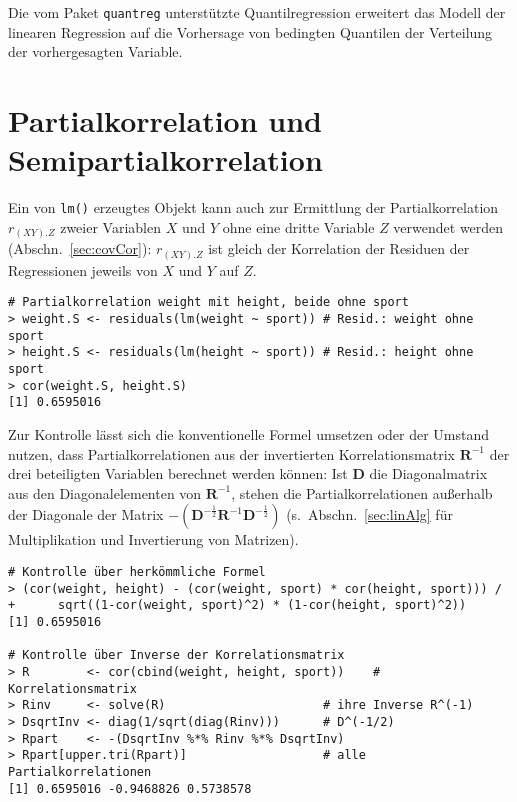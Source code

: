 Die vom Paket \lstinline!quantreg! \cite{Koenker2024} unterstützte Quantilregression erweitert das Modell der linearen Regression auf die Vorhersage von bedingten Quantilen der Verteilung der vorhergesagten Variable.

\section{Partialkorrelation und Semipartialkorrelation}
\label{sec:partCorReg}

Ein von \lstinline!lm()! erzeugtes Objekt kann auch zur Ermittlung der Partialkorrelation $r_{(XY).Z}$ zweier Variablen $X$ und $Y$ ohne eine dritte Variable $Z$ verwendet werden (Abschn.\ \ref{sec:covCor}): $r_{(XY).Z}$ ist gleich der Korrelation der Residuen der Regressionen jeweils von $X$ und $Y$ auf $Z$.
\begin{lstlisting}
# Partialkorrelation weight mit height, beide ohne sport
> weight.S <- residuals(lm(weight ~ sport)) # Resid.: weight ohne sport
> height.S <- residuals(lm(height ~ sport)) # Resid.: height ohne sport
> cor(weight.S, height.S)
[1] 0.6595016
\end{lstlisting}

Zur Kontrolle lässt sich die konventionelle Formel umsetzen oder der Umstand nutzen, dass Partialkorrelationen aus der invertierten Korrelationsmatrix $\bm{R}^{-1}$ der drei beteiligten Variablen berechnet werden können: Ist $\bm{D}$ die Diagonalmatrix aus den Diagonalelementen von $\bm{R}^{-1}$, stehen die Partialkorrelationen außerhalb der Diagonale der Matrix $-(\bm{D}^{-\frac{1}{2}} \bm{R}^{-1} \bm{D}^{-\frac{1}{2}})$ (s.\ Abschn.\ \ref{sec:linAlg} für Multiplikation und Invertierung von Matrizen).
\begin{lstlisting}
# Kontrolle über herkömmliche Formel
> (cor(weight, height) - (cor(weight, sport) * cor(height, sport))) /
+      sqrt((1-cor(weight, sport)^2) * (1-cor(height, sport)^2))
[1] 0.6595016

# Kontrolle über Inverse der Korrelationsmatrix
> R        <- cor(cbind(weight, height, sport))    # Korrelationsmatrix
> Rinv     <- solve(R)                      # ihre Inverse R^(-1)
> DsqrtInv <- diag(1/sqrt(diag(Rinv)))      # D^(-1/2)
> Rpart    <- -(DsqrtInv %*% Rinv %*% DsqrtInv)
> Rpart[upper.tri(Rpart)]                   # alle Partialkorrelationen
[1] 0.6595016 -0.9468826 0.5738578
\end{lstlisting}

